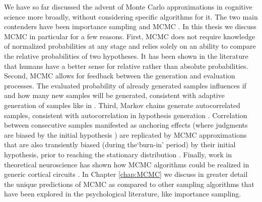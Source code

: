 We have so far discussed the advent of Monte Carlo approximations in cognitive science more broadly, without considering specific algorithms for it. The two main contenders have been importance sampling \cite{shi10} and MCMC \cite{Lieder2013}. In this thesis we discuss MCMC in particular for a few reasons. First, MCMC does not require knowledge of normalized probabilities at any stage and relies solely on an ability to compare the relative probabilities of two hypotheses. It has been shown in the literature \citep{stewart06} that humans have a better sense for relative rather than absolute probabilities. Second, MCMC allows for feedback between the generation and evaluation processes. The evaluated probability of already generated samples influences if and how many new samples will be generated, consistent with adaptive generation of samples like in \citet{hamrick2015think}. Third, Markov chains generate autocorrelated samples, consistent with autocorrelation in hypothesis generation \citep{multistability,vul08,Bonawitz2014}. Correlation between consecutive samples manifested as anchoring effects (where judgments are biased by the initial hypothesis \citep{tversky}) are replicated by MCMC approximations that are also transiently biased (during the`burn-in' period) by their initial hypothesis, prior to reaching the stationary distribution \citep{Lieder2013}. Finally, work in theoretical neuroscience has shown how MCMC algorithms could be realized in generic cortical circuits \citep{buesing11,pecevski11,Moreno11,bernstein2017markov}. In Chapter \ref{chap:MCMC} we discuss in greater detail the unique predictions of MCMC as compared to other sampling algorithms that have been explored in the psychological literature, like importance sampling.
%
%
